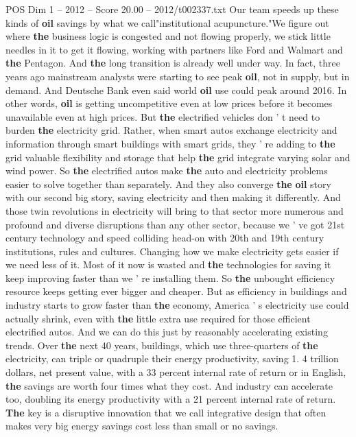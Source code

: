 \begin{textsample}{POS Dim 1 – 2012 – Score 20.00 – 2012/t002337.txt}
Our team speeds up these kinds of \textbf{oil} savings by what we call"institutional acupuncture."We figure out where \textbf{the} business logic is congested and not flowing properly, we stick little needles in it to get it flowing, working with partners like Ford and Walmart and \textbf{the} Pentagon.
And \textbf{the} long transition is already well under way.
In fact, three years ago mainstream analysts were starting to see peak \textbf{oil}, not in supply, but in demand.
And Deutsche Bank even said world \textbf{oil} use could peak around 2016.
In other words, \textbf{oil} is getting uncompetitive even at low prices before it becomes unavailable even at high prices.
But \textbf{the} electrified vehicles don ' t need to burden \textbf{the} electricity grid.
Rather, when smart autos exchange electricity and information through smart buildings with smart grids, they ' re adding to \textbf{the} grid valuable flexibility and storage that help \textbf{the} grid integrate varying solar and wind power.
So \textbf{the} electrified autos make \textbf{the} auto and electricity problems easier to solve together than separately.
And they also converge \textbf{the} \textbf{oil} story with our second big story, saving electricity and then making it differently.
And those twin revolutions in electricity will bring to that sector more numerous and profound and diverse disruptions than any other sector, because we ' ve got 21st century technology and speed colliding head-on with 20th and 19th century institutions, rules and cultures.
Changing how we make electricity gets easier if we need less of it.
Most of it now is wasted and \textbf{the} technologies for saving it keep improving faster than we ' re installing them.
So \textbf{the} unbought efficiency resource keeps getting ever bigger and cheaper.
But as efficiency in buildings and industry starts to grow faster than \textbf{the} economy, America ' s electricity use could actually shrink, even with \textbf{the} little extra use required for those efficient electrified autos.
And we can do this just by reasonably accelerating existing trends.
Over \textbf{the} next 40 years, buildings, which use three-quarters of \textbf{the} electricity, can triple or quadruple their energy productivity, saving 1. 4 trillion dollars, net present value, with a 33 percent internal rate of return or in English, \textbf{the} savings are worth four times what they cost.
And industry can accelerate too, doubling its energy productivity with a 21 percent internal rate of return. \textbf{The} key is a disruptive innovation that we call integrative design that often makes very big energy savings cost less than small or no savings.

\end{textsample}
